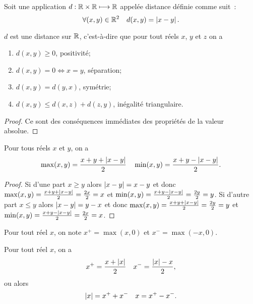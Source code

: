 \begin{defdef}
  Soit une application \(d:\mathbb{R}\times\mathbb{R}\longmapsto \mathbb{R}\) appelée distance définie comme suit~:
  \begin{equation}
    \forall (x,y) \in \mathbb{R}^2 \quad d(x,y)=\left\lvert x-y\right\rvert.
  \end{equation}
\end{defdef}
\begin{prop}
  \(d\) est une distance sur \(\mathbb{R}\), c'est-à-dire que pour tout réels \(x\), \(y\) et \(z\) on a
  \begin{enumerate}
  \item \(d(x,y)\geqslant 0\), positivité;
  \item \(d(x,y)=0 \iff x=y\), séparation;
  \item \(d(x,y)=d(y,x)\), symétrie;
  \item \(d(x,y)\leqslant d(x,z)+d(z,y)\), inégalité triangulaire.
  \end{enumerate}
\end{prop}
\begin{proof}
  Ce sont des conséquences immédiates des propriétés de la valeur absolue.
\end{proof}
\begin{prop}
  Pour tous réels \(x\) et \(y\), on a
  \begin{equation}
    \max(x,y)=\frac{x+y+\left\lvert x-y\right\rvert}{2} \quad \min(x,y)=\frac{x+y-\left\lvert x-y\right\rvert}{2}.
  \end{equation}
\end{prop}
\begin{proof}
  Si d'une part \(x\geqslant y\) alors \(\left\lvert x-y\right\rvert=x-y\) et donc \(\max(x,y)=\frac{x+y+\left\lvert x-y\right\rvert}{2}=\frac{2x}{2}=x\) et \(\min(x,y)=\frac{x+y-\left\lvert x-y\right\rvert}{2}=\frac{2y}{2}=y\). Si d'autre part \(x\leqslant y\) alors \(\left\lvert x-y\right\rvert=y-x\) et donc \(\max(x,y)=\frac{x+y+\left\lvert x-y\right\rvert}{2}=\frac{2y}{2}=y\) et \(\min(x,y)=\frac{x+y-\left\lvert x-y\right\rvert}{2}=\frac{2x}{2}=x\).
\end{proof}
\begin{defdef}
  Pour tout réel \(x\), on note \(x^+=\max(x,0)\) et \(x^-=\max(-x,0)\).
\end{defdef}
\begin{prop}
  Pour tout réel \(x\), on a
  \begin{equation}
    x^+=\frac{x+\left\lvert x\right\rvert}{2} \quad x^-=\frac{\left\lvert x\right\rvert-x}{2},
  \end{equation}
  ou alors
  \begin{equation}
    \left\lvert x\right\rvert=x^++x^- \quad x=x^+-x^-.
  \end{equation}
\end{prop}
